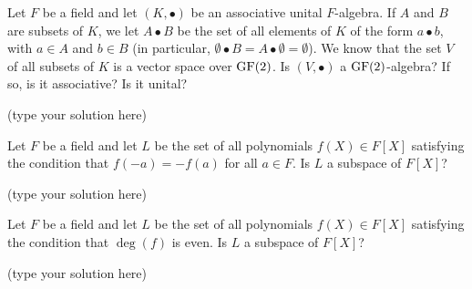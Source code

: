 \maketitle

\begin{ProbBox} %
\begin{problem}[Golan 124]
Let $F$ be a field and let $(K, \bullet)$ be an associative unital
$F$-algebra.  If $A$ and $B$ are subsets of $K$, we let $A\bullet B$ be the set
of all elements of $K$ of the form $a \bullet b$, with $a \in A$ and $b \in B$
(in particular, $\emptyset \bullet B = A \bullet \emptyset = \emptyset$).
We know that the set $V$ of all subsets of $K$ is a vector space over $\operatorname{GF}(2)$.
Is $(V, \bullet)$ a $\operatorname{GF}(2)$-algebra?  If so, is it associative?  Is it unital?
\end{problem}
\smallskip
\begin{solution}
(type your solution here)
\end{solution}
\end{ProbBox}
\probskip

\begin{ProbBox} %
\begin{problem}[Golan 132]
Let $F$ be a field and let $L$ be the set of all polynomials $f(X) \in F[X]$
satisfying the condition that $f(-a) = -f(a)$ for all $a\in F$.  Is $L$ a
subspace of $F[X]$?
\end{problem}
\smallskip
\begin{solution}
(type your solution here)
\end{solution}
\end{ProbBox}
\probskip

\begin{ProbBox} %
\begin{problem}[Golan 133]
Let $F$ be a field and let $L$ be the set of all polynomials $f(X) \in F[X]$
satisfying the condition that $\deg(f)$ is even.  Is $L$ a subspace of $F[X]$?
\end{problem}
\smallskip
\begin{solution}
(type your solution here)
\end{solution}
\end{ProbBox}
\probskip

